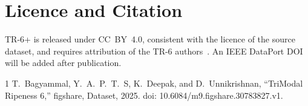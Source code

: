 \documentclass[journal]{IEEEtran}
\begin{document}
\section*{Licence and Citation}
TR-6+ is released under CC~BY~4.0, consistent with the licence of the source dataset, and requires attribution of the TR-6 authors~\cite{tr6}. An IEEE DataPort DOI will be added after publication.

\begin{thebibliography}{1}
T.~Bagyammal, Y.~A.~P.~T.~S, K.~Deepak, and D.~Unnikrishnan, ``TriModal Ripeness 6,'' figshare, Dataset, 2025. doi: 10.6084/m9.figshare.30783827.v1.
\end{thebibliography}
\end{document}
